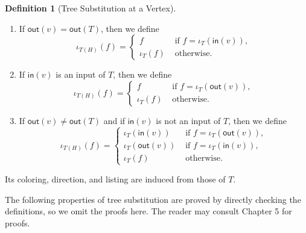 \documentclass[11pt]{amsbook}
\numberwithin{section}{chapter}
\numberwithin{subsection}{section}
\numberwithin{equation}{section}
\theoremstyle{plain}
\theoremstyle{definition}
\newtheorem{definition}[equation]{Definition}
\newcommand{\inp}{\mathsf{in}}
\newcommand{\out}{\mathsf{out}}
\begin{document}
\begin{definition}[Tree Substitution at a Vertex]
\begin{enumerate}
\begin{enumerate}
\item If $\out(v)=\out(T)$, then we define \[\iota_{T(H)}(f) =\begin{cases} f & \text{ if $f=\iota_T(\inp(v))$},\\ \iota_T(f) & \text{ otherwise}.\end{cases}\]
\item If $\inp(v)$ is an input of $T$, then we define \[\iota_{T(H)}(f)=\begin{cases} f & \text{ if $f=\iota_T(\out(v))$},\\ \iota_T(f) & \text{ otherwise}. \end{cases}\]
\item If $\out(v) \not= \out(T)$ and if $\inp(v)$ is not an input of $T$, then we define \[\iota_{T(H)}(f)=\begin{cases}\iota_T(\inp(v)) & \text{ if $f=\iota_T(\out(v))$},\\ \iota_T(\out(v)) & \text{ if $f=\iota_T(\inp(v))$},\\ \iota_T(f) & \text{ otherwise}.\end{cases}\]
\end{enumerate}
Its coloring, direction, and listing are induced from those of $T$.
\end{enumerate}\end{definition}

The following properties of tree substitution are proved by directly checking the definitions, so we omit the proofs here.  The reader may consult \cite{bluemonster} Chapter 5 for proofs.  
\end{document}
